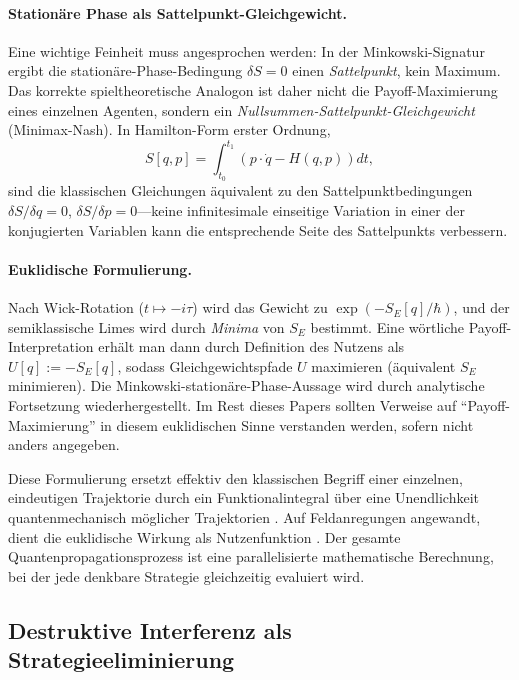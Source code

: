 \documentclass[12pt,a4paper]{article}
\theoremstyle{remark}
\begin{document}
\paragraph{Station\"are Phase als Sattelpunkt-Gleichgewicht.}
Eine wichtige Feinheit muss angesprochen werden: In der Minkowski-Signatur ergibt die station\"are-Phase-Bedingung $\delta S = 0$ einen \emph{Sattelpunkt}, kein Maximum. Das korrekte spieltheoretische Analogon ist daher nicht die Payoff-Maximierung eines einzelnen Agenten, sondern ein \emph{Nullsummen-Sattelpunkt-Gleichgewicht} (Minimax-Nash). In Hamilton-Form erster Ordnung,
\begin{equation}
S[q,p] = \int_{t_0}^{t_1} \left( p \cdot \dot{q} - H(q,p) \right) dt,
\end{equation}
sind die klassischen Gleichungen \"aquivalent zu den Sattelpunktbedingungen $\delta S / \delta q = 0$, $\delta S / \delta p = 0$---keine infinitesimale einseitige Variation in einer der konjugierten Variablen kann die entsprechende Seite des Sattelpunkts verbessern.

\paragraph{Euklidische Formulierung.}
Nach Wick-Rotation ($t \mapsto -i\tau$) wird das Gewicht zu $\exp(-S_E[q]/\hbar)$, und der semiklassische Limes wird durch \emph{Minima} von $S_E$ bestimmt. Eine w\"ortliche Payoff-Interpretation erh\"alt man dann durch Definition des Nutzens als $U[q] := -S_E[q]$, sodass Gleichgewichtspfade $U$ maximieren (\"aquivalent $S_E$ minimieren). Die Minkowski-station\"are-Phase-Aussage wird durch analytische Fortsetzung wiederhergestellt. Im Rest dieses Papers sollten Verweise auf ``Payoff-Maximierung'' in diesem euklidischen Sinne verstanden werden, sofern nicht anders angegeben.

Diese Formulierung ersetzt effektiv den klassischen Begriff einer einzelnen, eindeutigen Trajektorie durch ein Funktionalintegral \"uber eine Unendlichkeit quantenmechanisch m\"oglicher Trajektorien \citep{PathIntegral}. Auf Feldanregungen angewandt, dient die euklidische Wirkung als Nutzenfunktion \citep{PathIntegralOptimization}. Der gesamte Quantenpropagationsprozess ist eine parallelisierte mathematische Berechnung, bei der jede denkbare Strategie gleichzeitig evaluiert wird.

\subsection{Destruktive Interferenz als Strategieeliminierung}
\end{document}
